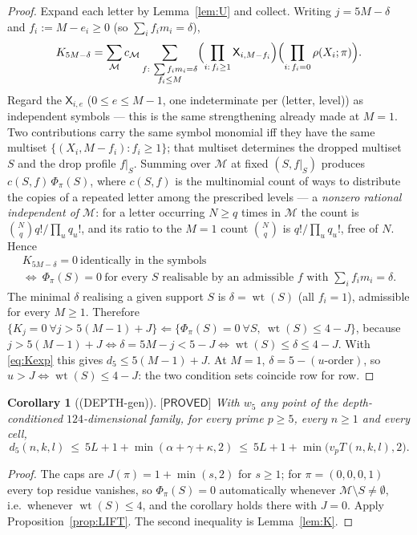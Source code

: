 \documentclass[11pt,reqno]{amsart}
\theoremstyle{plain}
\newtheorem{corollary}[theorem]{Corollary}
\theoremstyle{definition}
\theoremstyle{remark}
\numberwithin{equation}{section}
\newcommand{\wt}{\operatorname{wt}}
\newcommand{\Mcal}{\mathcal{M}}
\newcommand{\wfive}{w_5}
\newcommand{\PROVED}{\textsf{[PROVED]}}
\begin{document}
\begin{proof}
Expand each letter by Lemma~\ref{lem:U} and collect. Writing $j=5M-\delta$ and
$f_i:=M-e_i\ge0$ (so $\sum_if_im_i=\delta$),
\[
K_{5M-\delta}=\sum_{\Mcal}c_\Mcal\sum_{\substack{f:\ \sum f_im_i=\delta\\ f_i\le M}}
\Bigl(\prod_{i:\,f_i\ge1}\mathsf X_{i,M-f_i}\Bigr)
\Bigl(\prod_{i:\,f_i=0}\rho(X_i;\pi)\Bigr).
\]
Regard the $\mathsf X_{i,e}$ ($0\le e\le M-1$, one indeterminate per (letter, level)) as
independent symbols --- this is the same strengthening already made at $M=1$. Two contributions
carry the same symbol monomial iff they have the same multiset
$\{(X_i,M-f_i):f_i\ge1\}$; that multiset determines the dropped multiset $S$ and the drop
profile $f|_S$. Summing over $\Mcal$ at fixed $(S,f|_S)$ produces $c(S,f)\,\Phi_\pi(S)$, where
$c(S,f)$ is the multinomial count of ways to distribute the copies of a repeated letter among
the prescribed levels --- a \emph{nonzero rational independent of $\Mcal$}: for a letter
occurring $N\ge q$ times in $\Mcal$ the count is $\binom Nq q!/\prod_uq_u!$, and its ratio to
the $M=1$ count $\binom Nq$ is $q!/\prod_uq_u!$, free of $N$. Hence
\[
\begin{gathered}
K_{5M-\delta}=0\ \text{identically in the symbols}\\
\iff\ \Phi_\pi(S)=0\ \text{for every $S$ realisable by an admissible $f$ with }\textstyle\sum_if_im_i=\delta .
\end{gathered}
\]
The minimal $\delta$ realising a given support $S$ is $\delta=\wt(S)$ (all $f_i=1$), admissible
for every $M\ge1$. Therefore
$\{K_j=0\ \forall j>5(M-1)+J\}\Longleftarrow\{\Phi_\pi(S)=0\ \forall S,\ \wt(S)\le4-J\}$,
because $j>5(M-1)+J\iff\delta=5M-j<5-J\iff\wt(S)\le\delta\le4-J$. With \eqref{eq:Kexp} this
gives $d_5\le5(M-1)+J$. At $M=1$, $\delta=5-(u\text{-order})$, so $u>J\iff\wt(S)\le4-J$: the two
condition sets coincide row for row.
\end{proof}

\begin{corollary}[(DEPTH-gen)]\label{cor:depthgen}
$\PROVED$ With $\wfive$ any point of the depth-conditioned $124$-dimensional family, for
\emph{every} prime $p\ge5$, \emph{every} $n\ge1$ and \emph{every} cell,
\[
d_5(n,k,l)\ \le\ 5L+1+\min(\alpha+\gamma+\kappa,2)\ \le\ 5L+1+\min\bigl(v_pT(n,k,l),2\bigr).
\]
\end{corollary}

\begin{proof}
The caps are $J(\pi)=1+\min(s,2)$ for $s\ge1$; for $\pi=(0,0,0,1)$ every top residue vanishes,
so $\Phi_\pi(S)=0$ automatically whenever $\Mcal\setminus S\ne\emptyset$, i.e.\ whenever
$\wt(S)\le4$, and the corollary holds there with $J=0$. Apply Proposition~\ref{prop:LIFT}. The
second inequality is Lemma~\ref{lem:K}.
\end{proof}
\end{document}
